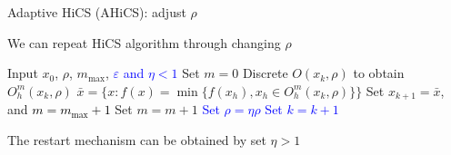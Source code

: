 \documentclass{beamer}
\begin{document}
\begin{frame}{Adaptive HiCS (AHiCS): adjust $\rho$}

\begin{itemize}
\footnotesize{
	\item We can repeat HiCS algorithm through changing $\rho$
		}
\vspace{-0.2cm}
\begin{algorithm}[H]
\scriptsize{
	\caption{AHiCS}
	\label{alg:refined}
\begin{algorithmic}[1]
	\STATE Input $x_0$, $\rho$, $m_{\max}$,
	\textcolor{blue}{$\varepsilon$ and $\eta<1$}
	\IF { \textcolor{blue}{ $\rho>\varepsilon$}}
		\STATE Set $m=0$
			\STATE Discrete $O(x_k,\rho)$ to obtain $O^m_h(x_k,\rho)$
			\STATE $\bar{x} = \{x: f(x)=\min\{f(x_h), x_h\in O^m_h(x_k, \rho) \} \}$
				\STATE Set $x_{k+1}=\bar{x}$, 
				and \textcolor{black}{$m=m_{\max}+1$} 
			\ELSE
				\STATE Set $m = m+1$
			\ENDIF
		\ELSE
			\STATE \textcolor{blue}{ Set $\rho=\eta\rho$}
		\ENDIF
		\STATE \textcolor{blue}{Set $k=k+1$}
	\ENDFOR
\ENDIF
\end{algorithmic}
}
\end{algorithm}
\vspace{-0.3cm}
\footnotesize{
	\item The restart mechanism can be obtained by set $\eta>1$
		}
\end{itemize}
\end{frame}
\end{document}
